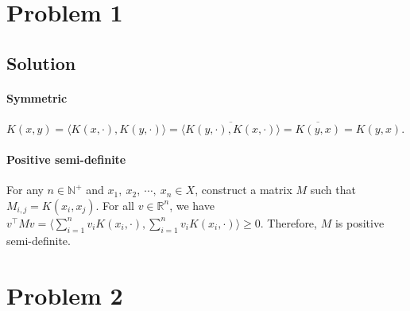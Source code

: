 \documentclass[11pt]{report}
\newcommand{\T}{\intercal}
\begin{document}

\section*{Problem 1}
\subsection*{Solution}
\paragraph{Symmetric} $K(x,y) = \langle K(x,\cdot), K(y,\cdot) \rangle = \overline{\langle K(y,\cdot), K(x,\cdot) \rangle} = \overline{K(y,x)} = K(y,x)$.
\paragraph{Positive semi-definite} For any $n \in \mathbb{N}^+$ and $x_1,\ x_2,\ \cdots,\ x_n \in X$, construct a matrix $M$ such that $M_{i,j} = K(x_i, x_j)$. For all $v \in \mathbb{R}^n$, we have $v^\T M v = \langle \sum_{i=1}^{n} v_i K(x_i, \cdot), \sum_{i=1}^{n} v_i K(x_i, \cdot) \rangle \geq 0$. Therefore, $M$ is positive semi-definite.

\section*{Problem 2}
\end{document}
